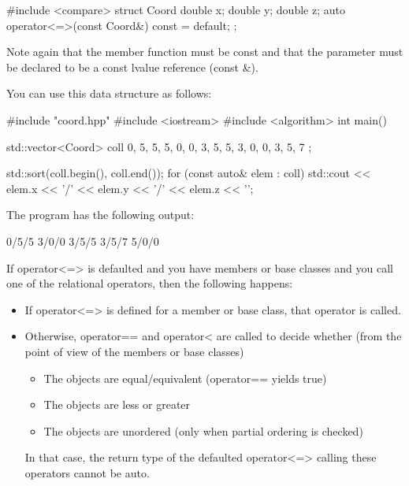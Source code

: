 
\begin{cpp}
#include <compare>
struct Coord {
	double x{};
	double y{};
	double z{};
	auto operator<=>(const Coord&) const = default;
};
\end{cpp}

Note again that the member function must be const and that the parameter must be declared to be a const lvalue reference (const \&).

You can use this data structure as follows:


\begin{cpp}
#include "coord.hpp"
#include <iostream>
#include <algorithm>
int main()
{
	std::vector<Coord> coll{ {0, 5, 5}, {5, 0, 0}, {3, 5, 5},
							 {3, 0, 0}, {3, 5, 7} };
							 
	std::sort(coll.begin(), coll.end());
	for (const auto& elem : coll) {
		std::cout << elem.x << '/' << elem.y << '/' << elem.z << '\n';
	}
}
\end{cpp}

The program has the following output:

\begin{shell}
0/5/5
3/0/0
3/5/5
3/5/7
5/0/0
\end{shell}


If operator<=> is defaulted and you have members or base classes and you call one of the relational operators, then the following happens:

\begin{itemize}
\item
If operator<=> is defined for a member or base class, that operator is called.

\item
Otherwise, operator== and operator< are called to decide whether (from the point of view of the members or base classes)

\begin{itemize}
\item
The objects are equal/equivalent (operator== yields true)

\item
The objects are less or greater

\item
The objects are unordered (only when partial ordering is checked)
\end{itemize}

In that case, the return type of the defaulted operator<=> calling these operators cannot be auto.
\end{itemize}

